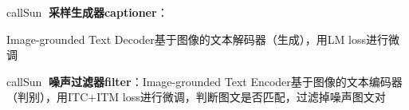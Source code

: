 \documentclass[zihao=false,fontset=windows]{ctexart}
\begin{document}
\begin{tcbraster}[raster columns=2, raster equal height=rows, raster column skip=9pt, raster row skip=8pt, raster left skip=0pt, raster right skip=0pt]
\begin{feishuboxnb}{callSun}{🌟}
\textcolor{feishuRed}{\textbf{采样生成器captioner}}：\par
Image-grounded Text Decoder基于图像的文本解码器（生成），用LM loss进行微调\par
\end{feishuboxnb}
\begin{feishuboxnb}{callSun}{🌟}
\textcolor{feishuRed}{\textbf{噪声过滤器filter}}：Image-grounded Text Encoder基于图像的文本编码器（判别），用ITC+ITM loss进行微调，判断图文是否匹配，过滤掉噪声图文对\par
\end{feishuboxnb}
\end{tcbraster}
\end{document}
